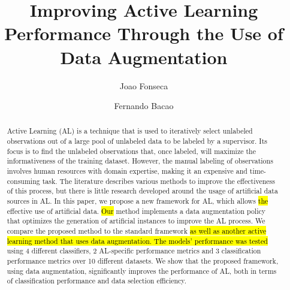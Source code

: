 \documentclass[preprint, 12pt]{elsarticle}
\begin{document}
\begin{frontmatter}

\title{%
    Improving Active Learning Performance Through the Use of Data Augmentation
}

\author[inst1]{Joao Fonseca}
\author[inst1]{Fernando Bacao}


\begin{abstract}

    Active Learning (AL) is a technique that is used to iteratively select
    unlabeled observations out of a large pool of unlabeled data to be labeled
    by a supervisor. Its focus is to find the unlabeled observations that,
    once labeled, will maximize the informativeness of the training dataset.
    However, the manual labeling of observations involves human resources with
    domain expertise, making it an expensive and time-consuming task. The
    literature describes various methods to improve the effectiveness of this
    process, but there is little research developed around the usage of
    artificial data sources in AL\@. In this paper, we propose a new framework
    for AL, which allows \hl{the} effective use of artificial data. \hl{Our}
    method implements a data augmentation policy that optimizes the generation
    of artificial instances to improve the AL process. We compare the proposed
    method to the standard framework \hl{as well as another active learning
    method that uses data augmentation. The models' performance was tested}
    using 4 different classifiers, 2 AL-specific performance metrics and 3
    classification performance metrics over 10 different datasets. We show
    that the proposed framework, using data augmentation, significantly
    improves the performance of AL, both in terms of classification
    performance and data selection efficiency. 
    
\end{abstract}


\end{frontmatter}
\end{document}
